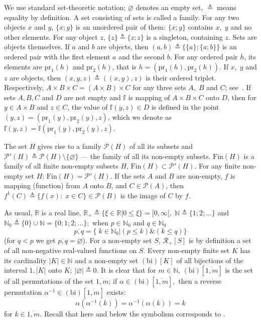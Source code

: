 \label{sec:1}


We use standard set-theoretic notation;
$\varnothing$ denotes an empty set,
${\triangleq}$ means equality by definition.
A set consisting of sets
is called a family.
For any two objects $x$
and $y$,
$\{x;y\}$
is an unordered pair of them:
$\{x;y\}$ contains $x,\;y$
and no other elements.
For any object $z$,
$\{z\} {\triangleq} \{z;z\}$
is a singleton, containing
$z$.
Sets are objects themselves.
If $a$ and $b$ are objects, then
\cite[~67]{15}
$(a,b) {\triangleq} \{\{a\};\{a;b\}\}$
is an ordered pair with
the first element $a$
and the second $b$.
For any ordered pair $h$,
its elements are
$\mathrm{pr}_1(h)$
and
$\mathrm{pr}_2(h)$,
that is
$h = (\mathrm{pr} _1(h),\mathrm{pr} _2(h))$.
If $x,\;y$ and $z$ are objects,
then
$(x,y,z) {\triangleq} ((x,y),z)$
is their ordered triplet.
Respectively,
$A \times B \times C = (A \times B) \times C$
for any three sets
$A,\;B$ and $C$;
see~\cite[17]{16}.
If sets
$A, B, C$
and
$D$
are not empty and
$\mathbb{f}$
is mapping of
$A\times B\times C$ onto $D$,
then for
$y \in A\times B$
and
$z \in C$,
the value of
$\mathbb f(y,z)\in D$
is defined in the point
$(y,z) = (\mathrm{pr}_1(y), \mathrm{pr}_2(y), z)$,
which we denote as
$\mathbb f(y,z) = \mathbb f(\mathrm{pr}_1(y), \mathrm{pr}_2(y), z)$.

The set $H$
gives rise to a family $\mathcal{P}(H)$
of all its subsets
and $\mathcal{P}'(H) {\triangleq}
\mathcal{P}(H) \setminus \{\varnothing\}$
--- the family of all its non-empty subsets.
$\mathrm{Fin}(H)$
is a family of all finite
non-empty subsets
$H$,
$\mathrm{Fin}(H) \subset \mathcal{P}'(H)$.
For any finite non-empty set
$H$:
$\mathrm{Fin}(H) = \mathcal{P}'(H)$.
If the sets $A$ and $B$ are non-empty,
$f$ is mapping (function) from $A$ onto $B$,
and $C \in \mathcal{P}(A)$,
then
$f^1(C) {\triangleq} \{f(x):\;x \in C\} \in \mathcal{P}(B)$
is the image of $C$ by $f$.

As usual,
$\mathbb{R}$ is a real line,
$\mathbb{R}_+ {\triangleq} \{\xi \in \mathbb{R} \vert 0 \le \xi\} = [0,\infty[,\;\mathbb{N} {\triangleq} \{1;2;...\}$
and $\mathbb{N}_0 {\triangleq} \{0\} \cup \mathbb{N} = \{0;1;2;...\};$
when $p \in \mathbb{N}_0$
and $q \in \mathbb{N}_0$
$$
\overline{p,q} = \{\;k \in \mathbb{N}_0 \vert (p \le k) \& (k \le q)\}
$$
(for $q < p$ we get $\overline{p,q} = \varnothing$).
For a non-empty set
$S$,
$\mathcal{R}_+[S]$
is
by definition
a set of all non-negative real-valued functions on
$S$.
Every non-empty finite set $K$
has its cardinality
$|K| \in \mathbb{N}$
and a non-empty set $(\mathrm{bi})[K]$
of all bijections
\cite[87]{17}
of the interval
$\overline{1,|K|}$
onto $K$;
$|\varnothing| {\triangleq} 0$.
It is clear that for
$m \in \mathbb{N}$,
$(\mathrm{bi})[\overline{1,m}]$
is the set of all permutations
\cite[87]{17}
of the set
$\overline{1,m}$;
if
$\alpha \in (\mathrm{bi})[\overline{1,m}],$
then a reverse permutation
$\alpha^{-1} \in (\mathrm{bi})[\overline{1,m}]$
exists:
$$
    \alpha(\alpha^{-1}(k)) = \alpha^{-1}(\alpha(k)) = k
$$
for $k \in \overline{1,m}.$
Recall that here and below the symbolism corresponds to
\cite[$\S$3.1]{4}.

